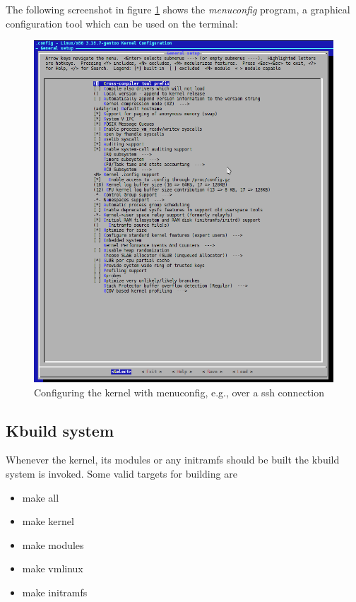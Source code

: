 The following screenshot in figure \ref{fig:menuconfig} 
shows the {\it menuconfig} program, 
a graphical configuration tool which can be used on the terminal:
\begin{figure}[ht]
  \centering
  \includegraphics[scale=0.5]{images/menuconfig}
  \caption{Configuring the kernel with menuconfig, e.g., over a ssh connection}
  \label{fig:menuconfig}
\end{figure}
\FloatBarrier

\subsection{Kbuild system}
Whenever the kernel, its modules or any initramfs should be built the kbuild system is invoked. 
Some valid targets for building are
\begin{itemize}
 \item make all
 \item make kernel
 \item make modules
 \item make vmlinux
 \item make initramfs
\end{itemize}

